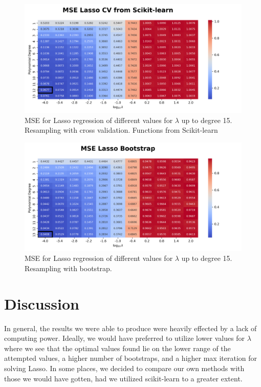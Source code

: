 \documentclass{article}
\begin{document}
\begin{figure}[htbp]
    \centering
    \includegraphics[width=\textwidth]{Project1/figures/Terrain/Heatmap_MSE_Lasso_CV_from_Scikit-learn.png}
    \caption{MSE for Lasso regression of different values for $\lambda$ up to degree 15. Resampling with cross validation. Functions from Scikit-learn}
    \label{fig:TerrainLassoCVsklearn}
\end{figure}

\begin{figure}[htbp]
    \centering
    \includegraphics[width=\textwidth]{Project1/figures/Terrain/Heatmap_MSE_Lasso_Bootstrap.png}
    \caption{MSE for Lasso regression of different values for $\lambda$ up to degree 15. Resampling with bootstrap.}
    \label{fig:TerrainLassoBootstrap}
\end{figure}


\newpage
\section{Discussion}
In general, the results we were able to produce were heavily effected by a lack of computing power. Ideally, we would have preferred to utilize lower values for $\lambda$ where we see that the optimal values found lie on the lower range of the attempted values, a higher number of bootstraps, and a higher max iteration for solving Lasso. In some places, we decided to compare our own methods with those we would have gotten, had we utilized scikit-learn to a greater extent.
\end{document}
